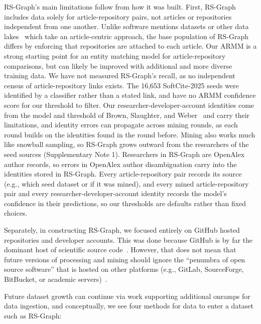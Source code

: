 \documentclass[pdflatex,sn-nature]{sn-jnl}%
\begin{document}
RS-Graph's main limitations follow from how it was built. First, RS-Graph includes data solely for article-repository pairs, not articles or repositories independent from one another. Unlike software mentions datasets or other data lakes~\cite{wilinski2026science} which take an article-centric approach, the base population of RS-Graph differs by enforcing that repositories are attached to each article. Our ARMM is a strong starting point for an entity matching model for article-repository comparisons, but can likely be improved with additional and more diverse training data. We have not measured RS-Graph's recall, as no independent census of article-repository links exists. The 16,653 SoftCite-2025 seeds were identified by a classifier rather than a stated link, and have no ARMM confidence score for our threshold to filter. Our researcher-developer-account identities come from the model and threshold of Brown, Slaughter, and Weber~\cite{brown2026code} and carry their limitations, and identity errors can propagate across mining rounds, as each round builds on the identities found in the round before. Mining also works much like snowball sampling, so RS-Graph grows outward from the researchers of the seed sources (Supplementary Note 1). Researchers in RS-Graph are OpenAlex author records, so errors in OpenAlex author disambiguation carry into the identities stored in RS-Graph. Every article-repository pair records its source (e.g., which seed dataset or if it was mined), and every mined article-repository pair and every researcher-developer-account identity records the model's confidence in their predictions, so our thresholds are defaults rather than fixed choices.

Separately, in constructing RS-Graph, we focused entirely on GitHub hosted repositories and developer accounts. This was done because GitHub is by far the dominant host of scientific source code~\cite{escamilla2022rise,cao2023rise}. However, that does not mean that future versions of processing and mining should ignore the ``penumbra of open source software'' that is hosted on other platforms (e.g., GitLab, SourceForge, BitBucket, or academic servers)~\cite{trujillo2022penumbra}.

Future dataset growth can continue via work supporting additional onramps for data ingestion, and conceptually, we see four methods for data to enter a dataset such as RS-Graph:
\end{document}
